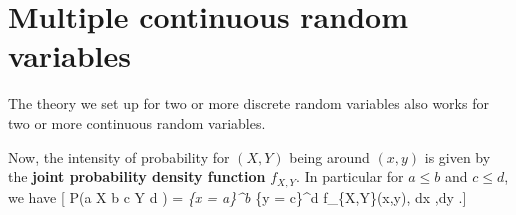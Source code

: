 \documentclass[
  letterpaper,
  DIV=11,
  numbers=noendperiod]{scrreprt}
\theoremstyle{remark}
\begin{document}
\hypertarget{continuous-multiple}{%
\section{Multiple continuous random
variables}\label{continuous-multiple}}

The theory we set up for two or more discrete random variables also
works for two or more continuous random variables.

Now, the intensity of probability for \((X,Y)\) being around \((x,y)\)
is given by the \textbf{joint probability density function} \(f_{X,Y}\).
In particular for \(a \leq b\) and \(c \leq d\), we have {[} \mathbb P(a
\leq X \leq b  c \leq Y \leq d ) = \int\emph{\{x = a\}\^{}b
\int}\{y = c\}\^{}d f\_\{X,Y\}(x,y), \mathrm dx ,\mathrm dy .{]}
\end{document}

